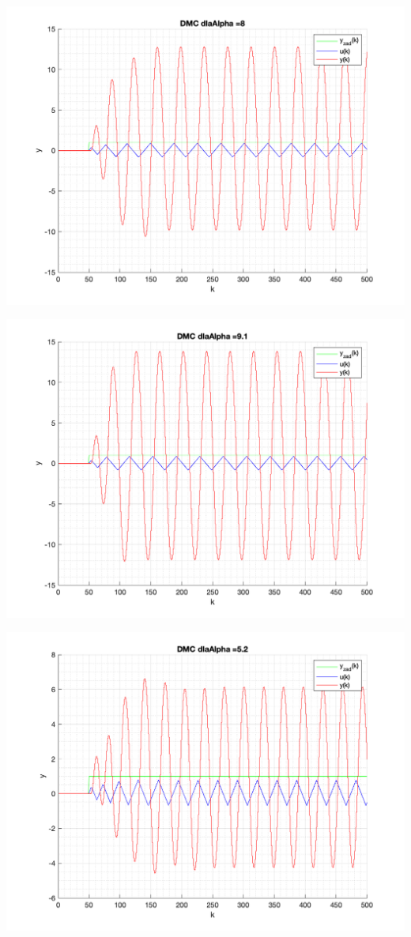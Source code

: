 \documentclass[a4paper, 11pt]{article}
\begin{document}
\begin{enumerate}
 \includegraphics[width=\linewidth]{./ModelsDodatkowe_Alpha/P4_DMC_Alpha_8_png.png} 
 
 \includegraphics[width=\linewidth]{./ModelsDodatkowe_Alpha/P4_DMC_Alpha_9_1_png.png} 
 
 \includegraphics[width=\linewidth]{./ModelsDodatkowe_Alpha/P4_DMC_Alpha_5_2_png.png} 
 

\end{enumerate}
\end{document}
